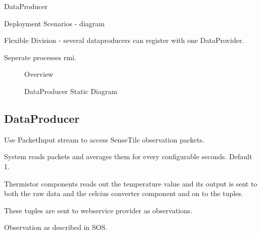 \documentclass[]{final_report}
\begin{document}
DataProducer

Deployment Scenarios - diagram

Flexible Division - several dataproducers can register with one DataProvider.

Seperate processes rmi.
 \begin{figure}
\caption{Overview}\label{fig:SystemOverview.png}
\end{figure}


 \begin{figure}
\caption{DataProducer Static Diagram}\label{fig:sensetile_static_diagam.png}
\end{figure}

\subsection{DataProducer}
Use PacketInput stream to access SenseTile observation packets.

System reads packets and averages them for every configurable seconds. Default 1.

Thermistor components reads out the temperature value
and its output is sent to both the raw data and the celcius
converter component and on to the tuples.

These tuples are sent to webservice provider as observations.

Observation as described in SOS.
\end{document}
